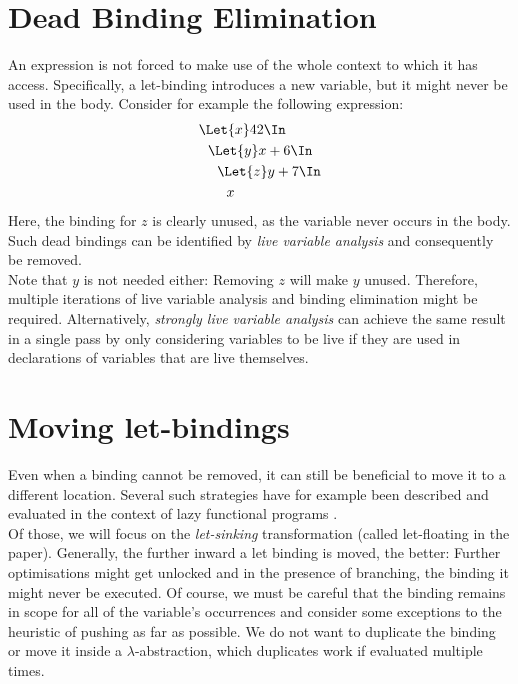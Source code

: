 \section{Dead Binding Elimination}
\label{sec:program-transformations-dbe}
An expression is not forced to make use of the whole context to which it has access.
Specifically, a let-binding introduces a new variable, but it might never be used
in the body.
Consider for example the following expression:
\begin{align*}
  &\Let{x} 42 \In            \\
  &\ \ \Let{y} x + 6 \In     \\
  &\ \ \ \ \Let{z} y + 7 \In \\
  &\ \ \ \ \ \ x
\end{align*}
Here, the binding for $z$ is clearly unused, as the variable never occurs in the body.
Such dead bindings can be identified by \emph{live variable analysis}
and consequently be removed.
\\
Note that $y$ is not needed either: Removing $z$ will make $y$ unused.
Therefore, multiple iterations of live variable analysis and binding elimination might be required.
Alternatively, \emph{strongly live variable analysis} can achieve the same result in a single pass
by only considering variables to be live
if they are used in declarations of variables that are live themselves.


\section{Moving let-bindings}
\label{sec:program-transformations-let-sinking}
Even when a binding cannot be removed,
it can still be beneficial to move it to a different location.
Several such strategies have for example been described and evaluated
in the context of lazy functional programs
\cite{Jones1996LetFloating}.
\\
Of those, we will focus on the \emph{let-sinking} transformation
(called let-floating in the paper).
Generally, the further inward a let binding is moved, the better:
Further optimisations might get unlocked and in the presence of branching,
the binding it might never be executed.
Of course, we must be careful that the binding remains in scope
for all of the variable's occurrences
and consider some exceptions to the heuristic of pushing as far as possible.
We do not want to duplicate the binding
or move it inside a $\lambda$-abstraction, which duplicates work
if evaluated multiple times.

\vspace{1cm}
